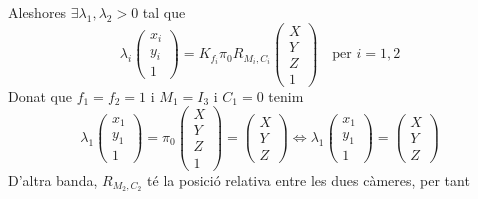 \documentclass[a4paper,12pt]{article}
\begin{document}
\begin{enumerate}
		Aleshores $\exists \lambda_1, \lambda_2 > 0$ tal que
		\begin{displaymath}
			\lambda_i \begin{pmatrix}x_i\\y_i\\1\end{pmatrix} = K_{f_i} \pi_0 R_{M_i, C_i} \begin{pmatrix}X\\Y\\Z\\1\end{pmatrix} \quad \text{per } i = 1, 2
		\end{displaymath}
		Donat que $f_1 = f_2 = 1$ i $M_1 = I_3$ i $C_1 = 0$ tenim
		\begin{displaymath}
			\lambda_1 \begin{pmatrix}x_1\\y_1\\1\end{pmatrix} = \pi_0 \begin{pmatrix}X\\Y\\Z\\1\end{pmatrix} = \begin{pmatrix}X\\Y\\Z\end{pmatrix} \iff \lambda_1 \begin{pmatrix}x_1\\y_1\\1\end{pmatrix} = \begin{pmatrix}X\\Y\\Z\end{pmatrix}
		\end{displaymath}
		D'altra banda, $R_{M_2, C_2}$ té la posició relativa entre les dues càmeres, per tant
		\begin{displaymath}

\end{displaymath}
\end{enumerate}
\end{document}
